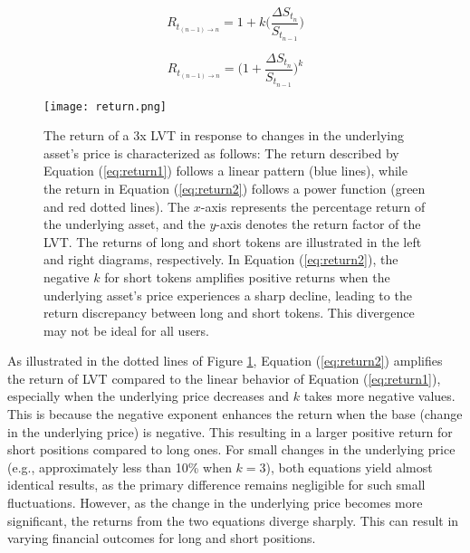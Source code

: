 \noindent
\begin{minipage}{0.5\linewidth}
	\begin{equation}
		R_{t_{(n-1)\to n}}=1+k\Big(\frac{\Delta S_{t_{n}}}{S_{t_{n-1}}}\Big) \label{eq:return1}
	\end{equation}
\end{minipage}
\begin{minipage}{0.5\linewidth}
	\begin{equation}
		R_{t_{(n-1)\to n}}=\Big(1+\frac{\Delta S_{t_{n}}}{S_{t_{n-1}}}\Big)^k \label{eq:return2}
	\end{equation}
\end{minipage}

\begin{figure}[t]
	\texttt{[image: return.png]}
	\caption[LVT return dynamics]{The return of a 3x LVT in response to changes in the underlying asset's price is characterized as follows: The return described by Equation (\ref{eq:return1}) follows a linear pattern (blue lines), while the return in Equation (\ref{eq:return2}) follows a power function (green and red dotted lines). The \(x\)-axis represents the percentage return of the underlying asset, and the \(y\)-axis denotes the return factor of the LVT. The returns of long and short tokens are illustrated in the left and right diagrams, respectively. In Equation (\ref{eq:return2}), the negative \(k\) for short tokens amplifies positive returns when the underlying asset's price experiences a sharp decline, leading to the return discrepancy between long and short tokens. This divergence may not be ideal for all users.}
	\label{fig:return}
\end{figure}

As illustrated in the dotted lines of Figure \ref{fig:return}, Equation (\ref{eq:return2}) amplifies the return of LVT compared to the linear behavior of Equation (\ref{eq:return1}), especially when the underlying price decreases and \(k\) takes more negative values. This is because the negative exponent enhances the return when the base (\ie change in the underlying price) is negative. This resulting in a larger positive return for short positions compared to long ones. For small changes in the underlying price (e.g., approximately less than 10\% when \(k = 3\)), both equations yield almost identical results, as the primary difference remains negligible for such small fluctuations. However, as the change in the underlying price becomes more significant, the returns from the two equations diverge sharply. This can result in varying financial outcomes for long and short positions.

